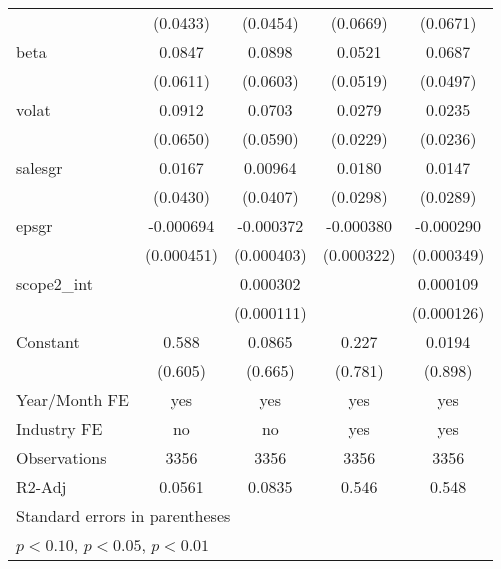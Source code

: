 \begin{table}[htbp]
\begin{tabular}{l*{4}{c}}
                    &    (0.0433)         &    (0.0454)         &    (0.0669)         &    (0.0671)         \\
[1em]
beta                &      0.0847         &      0.0898         &      0.0521         &      0.0687         \\
                    &    (0.0611)         &    (0.0603)         &    (0.0519)         &    (0.0497)         \\
[1em]
volat               &      0.0912         &      0.0703         &      0.0279         &      0.0235         \\
                    &    (0.0650)         &    (0.0590)         &    (0.0229)         &    (0.0236)         \\
[1em]
salesgr             &      0.0167         &     0.00964         &      0.0180         &      0.0147         \\
                    &    (0.0430)         &    (0.0407)         &    (0.0298)         &    (0.0289)         \\
[1em]
epsgr               &   -0.000694         &   -0.000372         &   -0.000380         &   -0.000290         \\
                    &  (0.000451)         &  (0.000403)         &  (0.000322)         &  (0.000349)         \\
[1em]
scope2\_int          &                     &    0.000302\sym{***}&                     &    0.000109         \\
                    &                     &  (0.000111)         &                     &  (0.000126)         \\
[1em]
Constant            &       0.588         &      0.0865         &       0.227         &      0.0194         \\
                    &     (0.605)         &     (0.665)         &     (0.781)         &     (0.898)         \\
\hline
Year/Month FE       &         yes         &         yes         &         yes         &         yes         \\
Industry FE         &          no         &          no         &         yes         &         yes         \\
Observations        &        3356         &        3356         &        3356         &        3356         \\
R2-Adj              &      0.0561         &      0.0835         &       0.546         &       0.548         \\
\hline\hline
\multicolumn{5}{l}{\footnotesize Standard errors in parentheses}\\
\multicolumn{5}{l}{\footnotesize \sym{*} \(p<0.10\), \sym{**} \(p<0.05\), \sym{***} \(p<0.01\)}\\
\end{tabular}
\end{table}
